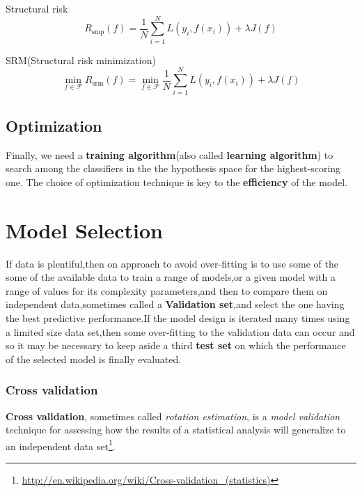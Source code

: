 \begin{definition}
Structural risk
\begin{equation}
R_{\mathrm{smp}}(f)=\dfrac{1}{N}\sum\limits_{i=1}^{N} L\left(y_i,f(x_i)\right) +\lambda J(f)
\end{equation}
\end{definition}

\begin{definition}
SRM(Structural risk minimization)
\begin{equation}
\min\limits _{f \in \mathcal{F}} R_{\mathrm{srm}}(f)=\min\limits _{f \in \mathcal{F}} \dfrac{1}{N}\sum\limits_{i=1}^{N} L\left(y_i,f(x_i)\right) +\lambda J(f)
\end{equation}
\end{definition}


\subsection{Optimization}
Finally, we need a \textbf{training algorithm}(also called \textbf{learning algorithm}) to search among the classifiers in the the hypothesis space for the highest-scoring one. The choice of optimization technique is key to the \textbf{efficiency} of the model.

\section{Model Selection}
If data is plentiful,then on approach to avoid over-fitting is to use some of the some of the available data to train a range of models,or a given model with a range of values for its complexity parameters,and then to compare them on independent data,sometimes called a \textbf{Validation set},and select the one having the best predictive performance.If the model design is iterated many times using a limited size data set,then some over-fitting to the validation data can occur and so it may be necessary to keep aside a third \textbf{test set} on which the performance of the selected model is finally evaluated.

\subsubsection{Cross validation}
\label{sec:Cross-validation}
\begin{definition}
	\textbf{Cross validation}, sometimes called \emph{rotation estimation}, is a \emph{model validation} technique for assessing how the results of a statistical analysis will generalize to an independent data set\footnote{\url{http://en.wikipedia.org/wiki/Cross-validation_(statistics)}}.
\end{definition}

